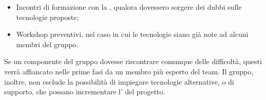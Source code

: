 \begin{itemize}
    \begin{itemize}
        \item Incontri di formazione con la , qualora dovessero sorgere dei dubbi sulle tecnologie proposte;
        \item Workshop preventivi, nel caso in cui le tecnologie siano già note ad alcuni membri del gruppo.
    \end{itemize}
    \par Se un componente del gruppo dovesse riscontrare comunque delle difficoltà, questi verrà affiancato nelle prime fasi da un membro più esperto del team. Il gruppo, inoltre, non esclude la possibilità di impiegare tecnologie alternative, o di supporto, che possano incrementare l' del progetto.
\end{itemize}
